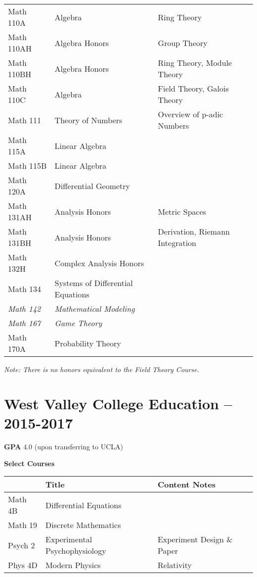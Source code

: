 \documentclass[11pt]{article}
\begin{document}
\begin{tabular}{l l l}
Math 110A & Algebra & Ring Theory \\
Math 110AH & Algebra Honors & Group Theory \\
Math 110BH & Algebra Honors & Ring Theory, Module Theory \\
Math 110C & Algebra & Field Theory, Galois Theory \\
Math 111 & Theory of Numbers & Overview of p-adic Numbers \\
Math 115A & Linear Algebra & \\
Math 115B & Linear Algebra & \\
Math 120A & Differential Geometry & \\
Math 131AH & Analysis Honors & Metric Spaces \\
Math 131BH & Analysis Honors & Derivation, Riemann Integration \\
Math 132H & Complex Analysis Honors & \\
Math 134 & Systems of Differential Equations & \\
\textit{Math 142} & \textit{Mathematical Modeling} & \\
\textit{Math 167} & \textit{Game Theory} & \\
Math 170A & Probability Theory & \\
\hline
\end{tabular}

\textit{Note: There is no honors equivalent to the Field Theory Course.}

\section{West Valley College Education -- 2015-2017}

\textbf{GPA} 4.0 (upon transferring to UCLA)

\textbf{Select Courses}

\begin{tabular}{l l l}
\hline
 & Title & Content Notes \\
\hline
Math 4B & Differential Equations & \\
Math 19 & Discrete Mathematics & \\
Psych 2 & Experimental Psychophysiology & Experiment Design \& Paper \\
Phys 4D & Modern Physics & Relativity \\
\hline
\end{tabular}
\end{document}
